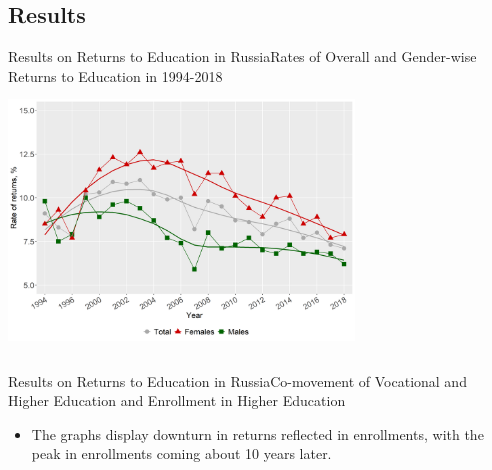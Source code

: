 \documentclass{beamer}
\begin{document}
\subsection{Results}
\begin{frame}{Results on Returns to Education in Russia}{Rates of Overall and Gender-wise Returns to Education in 1994-2018}
	\centering
	\includegraphics[width=260pt, height=200pt]{re_edu.png}
\end{frame}

\begin{frame}{Results on Returns to Education in Russia}{Co-movement of Vocational and Higher Education and Enrollment in Higher Education}
\begin{figure}
	\centering
	\hfill
\end{figure}
\begin{itemize}
	\vspace*{-0.2in}
	\item The graphs display downturn in returns reflected in enrollments, with the peak in enrollments coming about 10 years later.
\end{itemize}
\end{frame}
\end{document}
